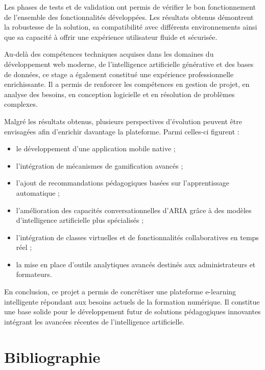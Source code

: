 \documentclass[12pt, a4paper]{report}
\begin{document}
Les phases de tests et de validation ont permis de vérifier le bon fonctionnement de l'ensemble des fonctionnalités développées. Les résultats obtenus démontrent la robustesse de la solution, sa compatibilité avec différents environnements ainsi que sa capacité à offrir une expérience utilisateur fluide et sécurisée.

Au-delà des compétences techniques acquises dans les domaines du développement web moderne, de l'intelligence artificielle générative et des bases de données, ce stage a également constitué une expérience professionnelle enrichissante. Il a permis de renforcer les compétences en gestion de projet, en analyse des besoins, en conception logicielle et en résolution de problèmes complexes.

Malgré les résultats obtenus, plusieurs perspectives d'évolution peuvent être envisagées afin d'enrichir davantage la plateforme. Parmi celles-ci figurent :

\begin{itemize}
    \item le développement d'une application mobile native ;
    \item l'intégration de mécanismes de gamification avancés ;
    \item l'ajout de recommandations pédagogiques basées sur l'apprentissage automatique ;
    \item l'amélioration des capacités conversationnelles d'ARIA grâce à des modèles d'intelligence artificielle plus spécialisés ;
    \item l'intégration de classes virtuelles et de fonctionnalités collaboratives en temps réel ;
    \item la mise en place d'outils analytiques avancés destinés aux administrateurs et formateurs.
\end{itemize}

En conclusion, ce projet a permis de concrétiser une plateforme e-learning intelligente répondant aux besoins actuels de la formation numérique. Il constitue une base solide pour le développement futur de solutions pédagogiques innovantes intégrant les avancées récentes de l'intelligence artificielle.


\chapter*{Bibliographie}
\end{document}
